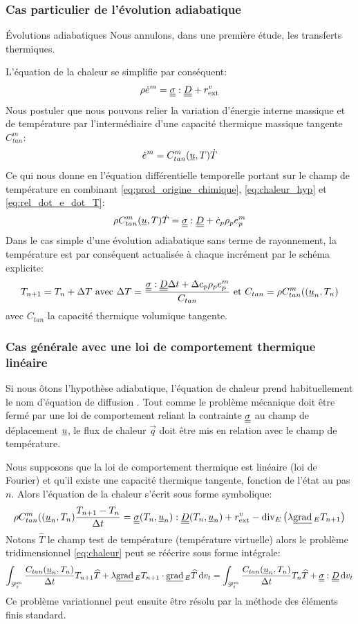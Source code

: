 \documentclass[10pt]{book}
\newcommand{\vgrad}{\vec{\text{grad}}\,}
\begin{document}
\subsubsection{Cas particulier de l'évolution adiabatique}
\begin{Hypothese}{Évolutions adiabatiques} Nous annulons, dans une première étude, les transferts thermiques.
\end{Hypothese}
L'équation de la chaleur se simplifie par conséquent:
\begin{equation}
\rho\dot{e}^{m}=\underline{\underline{\sigma}}:\underline{\underline{D}}+r^{v}_{\text{ext}}
\label{eq:chaleur_hyp}
\end{equation}
Nous postuler que nous pouvons relier la variation d'énergie interne massique et de température par l'intermédiaire d'une capacité thermique massique tangente $C^{m}_{tan}$:
\begin{equation}
\dot{e}^{m}=C^{m}_{tan}(\underline{u},T)\dot{T}
\label{eq:rel_dot_e_dot_T}
\end{equation}
Ce qui nous donne en l'équation différentielle temporelle portant sur le champ de température en combinant \eqref{eq:prod_origine_chimique}, \eqref{eq:chaleur_hyp} et \eqref{eq:rel_dot_e_dot_T}:
$$\rho C^{m}_{tan}(\underline{u},T)\dot{T} = \underline{\underline{\sigma}}:\underline{\underline{D}} +\dot{c}_{p}\rho_{p}e_{p}^{m}$$
Dans le cas simple d'une évolution adiabatique sans terme de rayonnement, la température est par conséquent actualisée à chaque incrément par le schéma explicite:
$$T_{n+1}=T_{n}+\Delta T \text{ avec } \Delta T =\dfrac{\underline{\underline{\sigma}}:\underline{\underline{D}}\Delta t+\Delta c_{p}\rho_{p}e_{p}^{m}}{C_{tan}} \text{ et } C_{tan}=\rho C^{m}_{tan}((\underline{u}_{n},T_{n})$$
avec $C_{tan}$ la capacité thermique volumique tangente.
\subsubsection{Cas générale avec une loi de comportement thermique linéaire}
Si nous ôtons l'hypothèse adiabatique, l'équation de chaleur prend habituellement le nom d'\og équation de diffusion \fg{}. Tout comme le problème mécanique doit être fermé par une loi de comportement reliant la contrainte $\underline{\underline{\sigma}}$ au champ de déplacement $\underline{u}$, le flux de chaleur $\vec{q}$ doit être mis en relation avec le champ de température.

Nous supposons que la loi de comportement thermique est linéaire (loi de Fourier) et qu'il existe une capacité thermique tangente, fonction de l'état au pas $n$. Alors l'équation de la chaleur s'écrit sous forme symbolique:
\begin{equation}
\rho C^{m}_{tan}((\Dep_{n},T_{n})\dfrac{T_{n+1}-T_{n}}{\Delta t}=\SC(T_{n},\Dep_{n}):\TD(T_{n},\Dep_{n})+\PCaloVol-\div_{E}\left(\lambda\vgrad_{E} T_{n+1}\right)
\label{eq:chaleur}
\end{equation}
Notons $\hat{T}$ le champ test de température (température virtuelle) alors le problème tridimensionnel \eqref{eq:chaleur} peut se réécrire sous forme intégrale:
$$\int_{\Dmt}\dfrac{C_{tan}(\Dep_{n},T_{n})}{\Delta t}T_{n+1}\hat{T}+\lambda \vgrad_{E}T_{n+1}\cdot\vgrad_{E}\hat{T}\dvt=\int_{\Dmt}\dfrac{C_{tan}(\Dep_{n},T_{n})}{\Delta t}T_{n}\hat{T}+\SC:\TD \dvt$$
Ce problème variationnel peut ensuite être résolu par la méthode des éléments finis standard.
\end{document}
